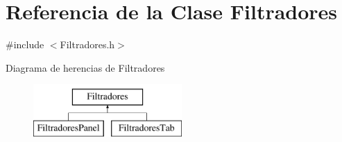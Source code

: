 \hypertarget{classFiltradores}{\section{\-Referencia de la \-Clase \-Filtradores}
\label{classFiltradores}
}


{\ttfamily \#include $<$\-Filtradores.\-h$>$}

\-Diagrama de herencias de \-Filtradores\begin{figure}[H]
\begin{center}
\leavevmode
\includegraphics[height=2.000000cm]{classFiltradores}
\end{center}
\end{figure}
